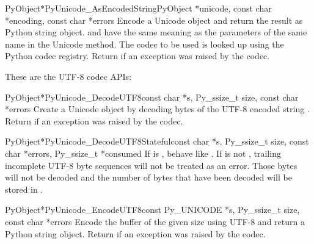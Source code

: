 \begin{cfuncdesc}{PyObject*}{PyUnicode_AsEncodedString}{PyObject *unicode,
                                               const char *encoding,
                                               const char *errors}
  Encode a Unicode object and return the result as Python string
  object.  and  have the same meaning as the
  parameters of the same name in the Unicode  method.
  The codec to be used is looked up using the Python codec registry.
  Return \NULL{} if an exception was raised by the codec.
\end{cfuncdesc}


These are the UTF-8 codec APIs:

\begin{cfuncdesc}{PyObject*}{PyUnicode_DecodeUTF8}{const char *s,
                                               Py_ssize_t size,
                                               const char *errors}
  Create a Unicode object by decoding  bytes of the UTF-8
  encoded string . Return \NULL{} if an exception was raised
  by the codec.
\end{cfuncdesc}

\begin{cfuncdesc}{PyObject*}{PyUnicode_DecodeUTF8Stateful}{const char *s,
                                               Py_ssize_t size,
                                               const char *errors,
                                               Py_ssize_t *consumed}
  If  is \NULL{}, behave like .
  If  is not \NULL{}, trailing incomplete UTF-8 byte sequences
  will not be treated as an error. Those bytes will not be decoded and the
  number of bytes that have been decoded will be stored in .
\end{cfuncdesc}

\begin{cfuncdesc}{PyObject*}{PyUnicode_EncodeUTF8}{const Py_UNICODE *s,
                                               Py_ssize_t size,
                                               const char *errors}
  Encode the  buffer of the given size using UTF-8
  and return a Python string object.  Return \NULL{} if an exception
  was raised by the codec.
\end{cfuncdesc}

